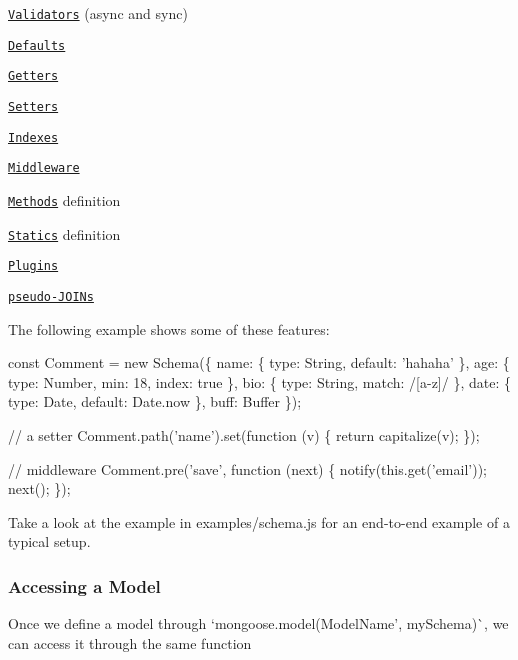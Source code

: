 \begin{DoxyItemize}
\item \href{http://mongoosejs.com/docs/validation.html}{\tt Validators} (async and sync)
\item \href{http://mongoosejs.com/docs/api.html#schematype_SchemaType-default}{\tt Defaults}
\item \href{http://mongoosejs.com/docs/api.html#schematype_SchemaType-get}{\tt Getters}
\item \href{http://mongoosejs.com/docs/api.html#schematype_SchemaType-set}{\tt Setters}
\item \href{http://mongoosejs.com/docs/guide.html#indexes}{\tt Indexes}
\item \href{http://mongoosejs.com/docs/middleware.html}{\tt Middleware}
\item \href{http://mongoosejs.com/docs/guide.html#methods}{\tt Methods} definition
\item \href{http://mongoosejs.com/docs/guide.html#statics}{\tt Statics} definition
\item \href{http://mongoosejs.com/docs/plugins.html}{\tt Plugins}
\item \href{http://mongoosejs.com/docs/populate.html}{\tt pseudo-\/\+J\+O\+I\+Ns}
\end{DoxyItemize}

The following example shows some of these features\+:


\begin{DoxyCode}
const Comment = new Schema(\{
  name: \{ type: String, default: 'hahaha' \},
  age: \{ type: Number, min: 18, index: true \},
  bio: \{ type: String, match: /[a-z]/ \},
  date: \{ type: Date, default: Date.now \},
  buff: Buffer
\});

// a setter
Comment.path('name').set(function (v) \{
  return capitalize(v);
\});

// middleware
Comment.pre('save', function (next) \{
  notify(this.get('email'));
  next();
\});
\end{DoxyCode}


Take a look at the example in {\ttfamily examples/schema.\+js} for an end-\/to-\/end example of a typical setup.

\subsubsection*{Accessing a Model}

Once we define a model through `mongoose.\+model(\textquotesingle{}Model\+Name', my\+Schema)\`{}, we can access it through the same function


